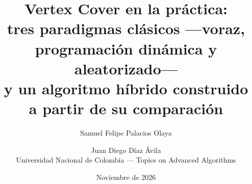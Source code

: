 \documentclass[11pt,a4paper]{article}
\title{\textbf{Vertex Cover en la práctica:}\\[2pt]
\large tres paradigmas clásicos ---voraz, programación dinámica y aleatorizado---\\
y un algoritmo híbrido construido a partir de su comparación}
\author{Samuel Felipe Palacios Olaya \and Juan Diego Díaz Ávila\\[2pt]
\small Universidad Nacional de Colombia --- Topics on Advanced Algorithms}
\date{Noviembre de 2026}
\theoremstyle{definition}
\theoremstyle{remark}
\begin{document}
\maketitle

\begin{abstract}

\end{abstract}

\tableofcontents
\newpage















\appendix

\end{document}
